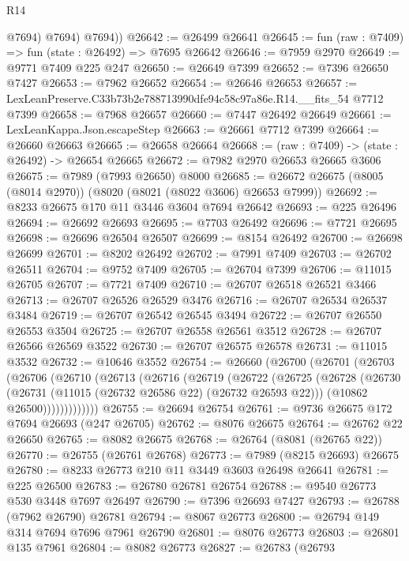 \begin{lexlean}{R14}
\begin{coremodule}
            @7694)
          @7694)
        @7694))
@26642 := @26499 @26641
@26645 := fun (raw : @7409) => fun (state : @26492) => @7695 @26642
@26646 := @7959 @2970
@26649 := @9771 @7409 @225 @247
@26650 := @26649 @7399
@26652 := @7396 @26650 @7427
@26653 := @7962 @26652
@26654 := @26646 @26653
@26657 := LexLeanPreserve.C33b73b2e788713990dfe94c58c97a86e.R14.__fits_54 @7712 @7399
@26658 := @7968 @26657
@26660 := @7447 @26492 @26649
@26661 := LexLeanKappa.Json.escapeStep
@26663 := @26661 @7712 @7399
@26664 := @26660 @26663
@26665 := @26658 @26664
@26668 := (raw : @7409) -> (state : @26492) -> @26654 @26665
@26672 := @7982 @2970 @26653 @26665 @3606
@26675 := @7989 (@7993 @26650) @8000
@26685 := @26672 @26675 (@8005 (@8014 @2970)) (@8020 (@8021 (@8022 @3606) @26653 @7999))
@26692 := @8233 @26675 @170 @11 @3446 @3604 @7694 @26642
@26693 := @225 @26496
@26694 := @26692 @26693
@26695 := @7703 @26492
@26696 := @7721 @26695
@26698 := @26696 @26504 @26507
@26699 := @8154 @26492
@26700 := @26698 @26699
@26701 := @8202 @26492
@26702 := @7991 @7409
@26703 := @26702 @26511
@26704 := @9752 @7409
@26705 := @26704 @7399
@26706 := @11015 @26705
@26707 := @7721 @7409
@26710 := @26707 @26518 @26521 @3466
@26713 := @26707 @26526 @26529 @3476
@26716 := @26707 @26534 @26537 @3484
@26719 := @26707 @26542 @26545 @3494
@26722 := @26707 @26550 @26553 @3504
@26725 := @26707 @26558 @26561 @3512
@26728 := @26707 @26566 @26569 @3522
@26730 := @26707 @26575 @26578
@26731 := @11015 @3532
@26732 := @10646 @3552
@26754 := @26660
    (@26700
      (@26701
        (@26703
          (@26706
            (@26710
              (@26713
                (@26716
                  (@26719
                    (@26722
                      (@26725
                        (@26728
                          (@26730
                            (@26731 (@11015 (@26732 @26586 @22) (@26732 @26593 @22)))
                            (@10862 @26500)))))))))))))
@26755 := @26694 @26754
@26761 := @9736 @26675 @172 @7694 @26693 (@247 @26705)
@26762 := @8076 @26675
@26764 := @26762 @22 @26650
@26765 := @8082 @26675
@26768 := @26764 (@8081 (@26765 @22))
@26770 := @26755 (@26761 @26768)
@26773 := @7989 (@8215 @26693) @26675
@26780 := @8233 @26773 @210 @11 @3449 @3603 @26498 @26641
@26781 := @225 @26500
@26783 := @26780 @26781 @26754
@26788 := @9540 @26773 @530 @3448 @7697 @26497
@26790 := @7396 @26693 @7427
@26793 := @26788 (@7962 @26790) @26781
@26794 := @8067 @26773
@26800 := @26794 @149 @314 @7694 @7696 @7961 @26790
@26801 := @8076 @26773
@26803 := @26801 @135 @7961
@26804 := @8082 @26773
@26827 := @26783
    (@26793

\end{coremodule}
\end{lexlean}
